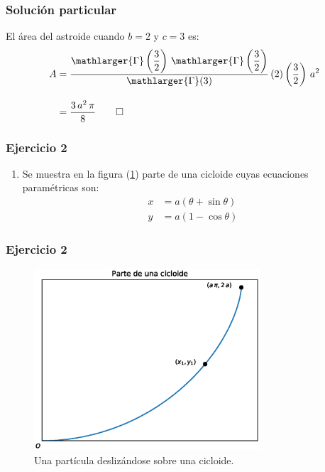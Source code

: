 \documentclass[12pt]{beamer}
\begin{document}
\begin{frame}
\frametitle{Solución particular}
El área del astroide cuando $b = 2$ y $c = 3$ es:
\pause
\begin{align*}
A &= \dfrac{\mathlarger{\Gamma} \left( \dfrac{3}{2} \right) \, \mathlarger{\Gamma} \left( \dfrac{3}{2} \right)}{\mathlarger{\Gamma} (3)} \, (2) \left( \dfrac{3}{2} \right) \, a^{2} \\[1em]
&= \dfrac{3 \, a^{2} \, \pi}{8} \qed
\end{align*}
\end{frame}

\begin{frame}
\frametitle{Ejercicio 2}
\begin{enumerate}[<+->]
\conti
\item Se muestra en la figura (\ref{fig:figura_cicloide}) parte de una cicloide cuyas ecuaciones paramétricas son:
\begin{align*}
x &= a (\theta + \sin \theta) \\[0.5em]
y &= a (1 - \cos \theta)
\end{align*}
\seti
\end{enumerate}
\end{frame}
\begin{frame}
\frametitle{Ejercicio 2}
\begin{figure}
    \centering
    \includegraphics[width=0.75\textwidth]{Imagenes/plot_cicloide.eps}
    \caption{Una partícula deslizándose sobre una cicloide.}
    \label{fig:figura_cicloide}
\end{figure}
\end{frame}
\end{document}
